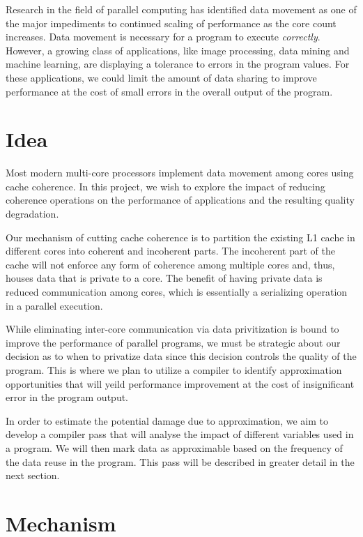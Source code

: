 \documentclass[12pt,conference]{IEEEtran}
\begin{document}
Research in the field of parallel computing has 
identified data movement as one of the major impediments
to continued scaling of performance as the core count
increases. Data movement is necessary for a
program to execute \emph{correctly}. However, a growing class
of applications, like image processing, data mining and machine learning,
are displaying a tolerance to errors in the 
program values. For these applications, we could limit the 
amount of data sharing to improve performance at the cost of 
small errors in the overall output of the program.

\section{Idea}

Most modern multi-core processors implement data movement among cores
using cache coherence. In this project, we wish to explore the impact 
of reducing 
coherence operations on the performance of applications and the 
resulting quality degradation. 

Our mechanism of cutting cache coherence is to partition the
existing L1 cache in different cores into coherent and 
incoherent parts. The incoherent part of the cache will not
enforce any form of coherence among multiple cores and, thus,
houses data that is private to a core. The benefit of having private
data is reduced communication among cores, which is essentially a 
serializing operation in a parallel execution. 

While eliminating inter-core communication via data privitization
is bound to improve the performance of parallel programs, we must
be strategic about our decision as to when to privatize data since this 
decision controls the quality of the program. This is where we plan to 
utilize a compiler to identify approximation opportunities that will 
yeild performance improvement at the cost of insignificant error in the
program output.

In order to estimate the potential damage due to approximation, we aim
to develop a compiler pass that will analyse the impact of different 
variables used in a program. We will then mark data as approximable based 
on the frequency of the data reuse in the program. This pass will be 
described in greater detail in the next section.

\section{Mechanism}
\end{document}
